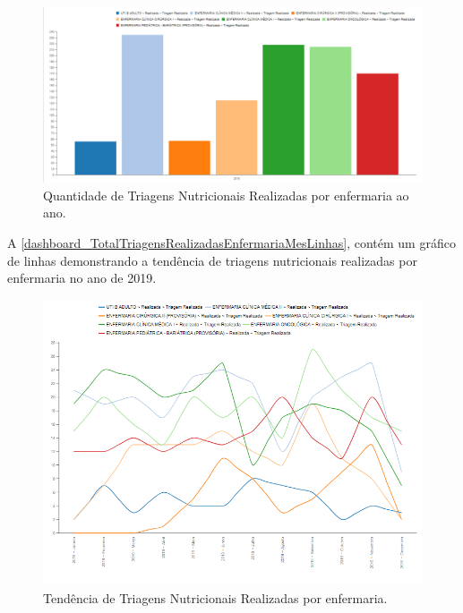 \newpage
\begin{figure}[htb]
	\caption{\label{dashboard_TotalTriagensRealizadasEnfermariaAnoBarras}Quantidade de Triagens Nutricionais Realizadas por enfermaria ao ano.}
	\begin{center}
	    \includegraphics[scale=0.4]{Imagens/1.3.TotalTriagensRealizadasEnfermariaAnoBarras.png}
	\end{center}
\end{figure}

A \autoref{dashboard_TotalTriagensRealizadasEnfermariaMesLinhas}, contém um gráfico de linhas demonstrando a tendência de triagens nutricionais realizadas por enfermaria no ano de 2019.

\begin{figure}[htb]
	\caption{\label{dashboard_TotalTriagensRealizadasEnfermariaMesLinhas}Tendência de Triagens Nutricionais Realizadas por enfermaria.}
	\begin{center}
	    \includegraphics[scale=0.63]{Imagens/1.4.TotalTriagensRealizadasEnfermariaMesLinhas.png}
	\end{center}
\end{figure}


